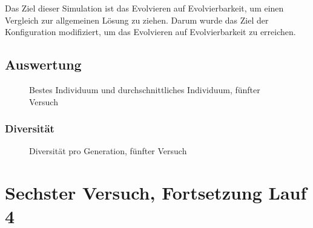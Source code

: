       Das Ziel dieser Simulation ist das Evolvieren auf Evolvierbarkeit,
      um einen Vergleich zur allgemeinen Lösung zu ziehen.
      Darum wurde das Ziel der Konfiguration modifiziert, um das Evolvieren auf Evolvierbarkeit zu erreichen.

    \subsection{Auswertung\label{sub:fifthAuswertung}}

      \begin{figure}[H]
        \centering
        
        \caption{Bestes Individuum und durchschnittliches Individuum, fünfter Versuch\label{fig:graphFifth}}
      \end{figure}

      \subsubsection{Diversität}

        \begin{figure}[H]
          \centering
          
          \caption{Diversität pro Generation, fünfter Versuch\label{fig:graphDivFourth}}
        \end{figure}

  \section{Sechster Versuch, Fortsetzung Lauf 4\label{sec:sixthSimulation}}
